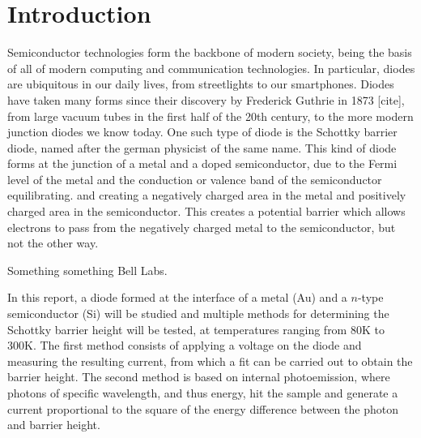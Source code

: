 \section{Introduction}
Semiconductor technologies form the backbone of modern society, being the basis of all of modern computing and communication technologies. In particular, diodes are ubiquitous in our daily lives, from streetlights to our smartphones. Diodes have taken many forms since their discovery by Frederick Guthrie in 1873 [cite], from large vacuum tubes in the first half of the 20th century, to the more modern junction diodes we know today. One such type of diode is the Schottky barrier diode, named after the german physicist of the same name.
This kind of diode forms at the junction of a metal and a doped semiconductor, due to the Fermi level of the metal and the conduction or valence band of the semiconductor equilibrating. and creating a negatively charged area in the metal and positively charged area in the semiconductor. This creates a potential barrier which allows electrons to pass from the negatively charged metal to the semiconductor, but not the other way.


Something something Bell Labs.


In this report, a diode formed at the interface of a metal (Au) and a $n$-type semiconductor (Si) will be studied and multiple methods for determining the Schottky barrier height will be tested, at temperatures ranging from 80K to 300K. The first method consists of applying a voltage on the diode and measuring the resulting current, from which a fit can be carried out to obtain the barrier height. The second method is based on internal photoemission, where photons of specific wavelength, and thus energy, hit the sample and generate a current proportional to the square of the energy difference between the photon and barrier height.
